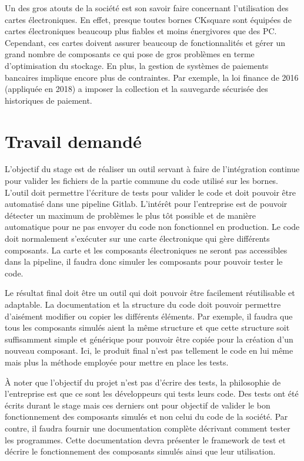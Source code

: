 \documentclass[a4paper]{article}
\begin{document}
Un des gros atouts de la société est son savoir faire concernant l'utilisation
des cartes électroniques. En effet, presque toutes bornes CKsquare sont équipées
de cartes électroniques beaucoup plus fiables et moins énergivores que des PC.
Cependant, ces cartes doivent assurer beaucoup de fonctionnalités et gérer un
grand nombre de composants ce qui pose de gros problèmes en terme d'optimisation
du stockage. En plus, la gestion de systèmes de paiements bancaires implique
encore plus de contraintes. Par exemple, la loi finance de 2016 (appliquée en
2018) a imposer la collection et la sauvegarde sécurisée des historiques de
paiement.
\section{Travail demandé}%

L'objectif du stage est de réaliser un outil servant à faire de l'intégration
continue pour valider les fichiers de la partie commune du code utilisé sur les
bornes. L'outil doit permettre l'écriture de tests pour valider le code et doit
pouvoir être automatisé dans une pipeline Gitlab. L'intérêt pour l'entreprise
est de pouvoir détecter un maximum de problèmes le plus tôt possible et de
manière automatique pour ne pas envoyer du code non fonctionnel en production.
Le code doit normalement s'exécuter sur une carte électronique qui gère
différents composants. La carte et les composants électroniques ne seront pas
accessibles dans la pipeline, il faudra donc simuler les composants pour pouvoir
tester le code.

Le résultat final doit être un outil qui doit pouvoir être facilement
réutilisable et adaptable. La documentation et la structure du code doit pouvoir
permettre d'aisément modifier ou copier les différents éléments. Par exemple, il
faudra que tous les composants simulés aient la même structure et que cette
structure soit suffisamment simple et générique pour pouvoir être copiée pour la
création d'un nouveau composant. Ici, le produit final n'est pas tellement le
code en lui même mais plus la méthode employée pour mettre en place les tests.

À noter que l'objectif du projet n'est pas d'écrire des tests, la philosophie de
l'entreprise est que ce sont les développeurs qui tests leurs code. Des tests
ont été écrits durant le stage mais ces derniers ont pour objectif de valider
le bon fonctionnement des composants simulés et non celui du code de la société.
Par contre, il faudra fournir une documentation complète décrivant comment
tester les programmes. Cette documentation devra présenter le framework de test
et décrire le fonctionnement des composants simulés ainsi que leur utilisation.
\end{document}
